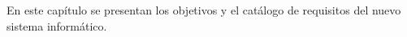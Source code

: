 
En este capítulo se presentan los objetivos y el catálogo de requisitos del nuevo sistema informático. 

    

